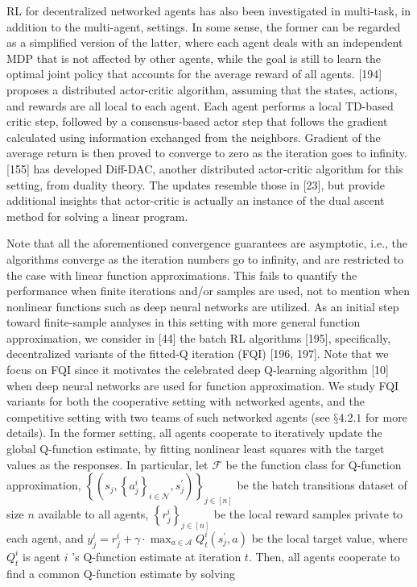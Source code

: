 \documentclass[10pt]{article}
\begin{document}
RL for decentralized networked agents has also been investigated in multi-task, in addition to the multi-agent, settings. In some sense, the former can be regarded as a simplified version of the latter, where each agent deals with an independent MDP that is not affected by other agents, while the goal is still to learn the optimal joint policy that accounts for the average reward of all agents. [194] proposes a distributed actor-critic algorithm, assuming that the states, actions, and rewards are all local to each agent. Each agent performs a local TD-based critic step, followed by a consensus-based actor step that follows the gradient calculated using information exchanged from the neighbors. Gradient of the average return is then proved to converge to zero as the iteration goes to infinity. [155] has developed Diff-DAC, another distributed actor-critic algorithm for this setting, from duality theory. The updates resemble those in [23], but provide additional insights that actor-critic is actually an instance of the dual ascent method for solving a linear program.

Note that all the aforementioned convergence guarantees are asymptotic, i.e., the algorithms converge as the iteration numbers go to infinity, and are restricted to the case with linear function approximations. This fails to quantify the performance when finite iterations and/or samples are used, not to mention when nonlinear functions such as deep neural networks are utilized. As an initial step toward finite-sample analyses in this setting with more general function approximation, we consider in [44] the batch RL algorithms [195], specifically, decentralized variants of the fitted-Q iteration (FQI) [196, 197]. Note that we focus on FQI since it motivates the celebrated deep Q-learning algorithm [10] when deep neural networks are used for function approximation. We study FQI variants for both the cooperative setting with networked agents, and the competitive setting with two teams of such networked agents (see $§ 4.2 .1$ for more details). In the former setting, all agents cooperate to iteratively update the global Q-function estimate, by fitting nonlinear least squares with the target values as the responses. In particular, let $\mathcal{F}$ be the function class for Q-function approximation, $\left\{\left(s_{j},\left\{a_{j}^{i}\right\}_{i \in \mathcal{N}}, s_{j}^{\prime}\right)\right\}_{j \in[n]}$ be the batch transitions dataset of size $n$ available to all agents, $\left\{r_{j}^{i}\right\}_{j \in[n]}$ be the local reward samples private to each agent, and $y_{j}^{i}=r_{j}^{i}+\gamma \cdot \max _{a \in \mathcal{A}} Q_{t}^{i}\left(s_{j}^{\prime}, a\right)$ be the local target value, where $Q_{t}^{i}$ is agent $i$ 's Q-function estimate at iteration $t$. Then, all agents cooperate to find a common Q-function estimate by solving
\end{document}
